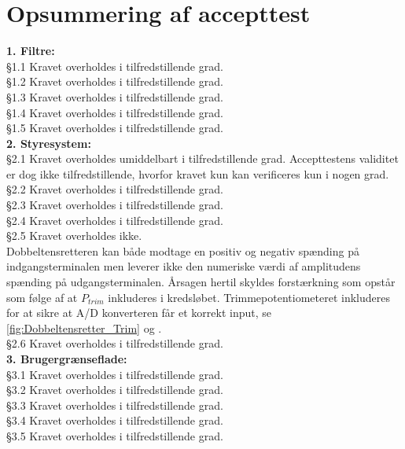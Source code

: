 \section{Opsummering af accepttest}
\label{OpsummeringAfAccepttest}
\textbf{1. Filtre:}\\
§1.1 Kravet overholdes i tilfredstillende grad.\\
%
§1.2 Kravet overholdes i tilfredstillende grad.\\
% 
§1.3 Kravet overholdes i tilfredstillende grad.\\
% 
§1.4 Kravet overholdes i tilfredstillende grad.\\
%
§1.5 Kravet overholdes i tilfredstillende grad.\\ 
\blankline 
\textbf{2. Styresystem:}\\
§2.1 Kravet overholdes umiddelbart i tilfredstillende grad. Accepttestens validitet er dog ikke tilfredstillende, hvorfor kravet kun kan verificeres kun i nogen grad.\\
%
§2.2 Kravet overholdes i tilfredstillende grad.\\
%
§2.3 Kravet overholdes i tilfredstillende grad.\\ 
%
§2.4 Kravet overholdes i tilfredstillende grad.\\
%
§2.5 Kravet overholdes ikke.\\
Dobbeltensretteren kan både modtage en positiv og negativ spænding på indgangsterminalen men leverer ikke den numeriske værdi af amplitudens spænding på udgangsterminalen. Årsagen hertil skyldes forstærkning som opstår som følge af at $P_{trim}$ inkluderes i kredsløbet. Trimmepotentiometeret inkluderes for at sikre at A/D konverteren får et korrekt input, se \autoref{fig:Dobbeltensretter_Trim} og .\\     
%
§2.6 Kravet overholdes i tilfredstillende grad.\\
%
\blankline
\textbf{3. Brugergrænseflade:}\\
§3.1 Kravet overholdes i tilfredstillende grad.\\ 
%
§3.2 Kravet overholdes i tilfredstillende grad.\\
%
§3.3 Kravet overholdes i tilfredstillende grad.\\ 
%
§3.4 Kravet overholdes i tilfredstillende grad.\\
%
§3.5 Kravet overholdes i tilfredstillende grad.\\ 
%
